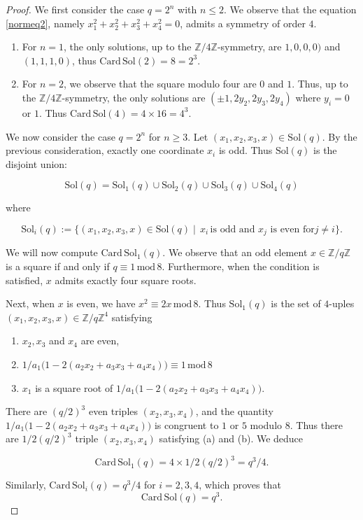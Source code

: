 \documentclass[12pt]{amsart}
\newcommand{\Z}{\mathbb{Z}}
\newcommand{\Card}{\mathrm{Card\,}}
\newcommand{\Sol}{{\mathrm {Sol}}}
\renewcommand{\mod}{\,\mathrm{mod}\,}
\begin{document}
\begin{proof}
We first consider the case $q=2^n$ with $n\leq 2$.
We observe that the equation \ref{normeq2}, namely 
$x_1^2+x_2^2+x_3^2+x_4^2=0$, admits a symmetry of order $4$. 

\begin{enumerate}
\item[(a)] For $n=1$, the only solutions, up to the $\Z/4\Z$-symmetry, are
$1,0,0,0)$ and $(1,1,1,0)$, thus
  $\Card\Sol(2)=8=2^3.$
  
\item[(b)]
For $n=2$, we observe that the square modulo four
are $0$ and $1$. Thus, up to the $\Z/4\Z$-symmetry, the only solutions
are $(\pm1, 2y_2, 2y_3, 2 y_4)$ where $y_i=0$ or $1$.
Thus  $\Card\Sol(4)=4\times 16=4^3.$
\end{enumerate}

We now consider the case $q=2^n$ for $n\geq 3$. 
Let $(x_1,x_2,x_3,x)\in 
\Sol(q)$.
By the previous consideration, exactly one
coordinate $x_i$ is odd. Thus 
$\Sol(q)$ is the disjoint union:

$$\Sol(q)=\Sol_1(q)\cup\Sol_2(q)\cup\Sol_3(q)\cup\Sol_4(q)$$

\noindent where 

$$\Sol_i(q):=\{(x_1,x_2,x_3,x)\in 
\Sol(q)\mid\,x_i\,\text{is odd and } x_j \text{ is even for}
j\neq i\}.$$

We will now compute $\Card\Sol_1(q)$. We observe
that an odd element $x\in \Z/q\Z$ is a square
if and only if $q\equiv 1\mod 8$. Furthermore,  when the condition is satisfied, $x$ admits exactly four square roots.

Next, when $x$ is even, we have $x^2\equiv 2 x\mod 8$.
Thus $\Sol_1(q)$ is the set of $4$-uples 
$(x_1,x_2,x_3,x)\in\Z/q\Z^4$ satisfying

\begin{enumerate}
\item[(a)] $x_2, x_3$ and $x_4$ are even,
\item[(b)] $1/a_1\big(1-2(a_2x_2+a_3x_3+a_4x_4)\big)\equiv 1\mod 8$
\item[(c)] $x_1$ is a square root of 
$1/a_1\big(1-2(a_2x_2+a_3x_3+a_4x_4)\big)$.
\end{enumerate}

There are $(q/2)^3$ even triples $(x_2, x_3,x_4)$, and
the quantity 
$1/a_1\big(1-2(a_2x_2+a_3x_3+a_4x_4)\big)$ is congruent  to $1$ or $5$ modulo $8$. Thus there are $1/2 (q/2)^3$
triple $(x_2, x_3,x_4)$ satisfying (a) and (b). We deduce

$$\Card\Sol_1(q)=4\times 1/2(q/2)^3=q^3/4.$$

Similarly, $\Card\Sol_i(q)=q^3/4$ for $i=2,3, 4$, which proves that 
$$\Card\Sol(q)=q^3.$$
\end{proof}
\end{document}
